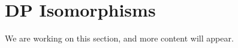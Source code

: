 
\section{DP Isomorphisms}

\begin{publictodo}
\begin{publictodo}We are working on this section, and more content will appear.\end{publictodo}
\end{publictodo}

